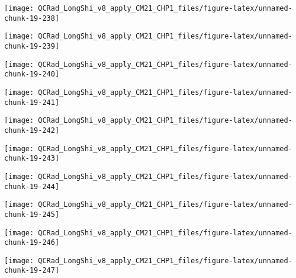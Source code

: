 \documentclass[
  10pt,
  a4paper,oneside]{article}
\begin{document}
\begin{center}\texttt{[image: QCRad\_LongShi\_v8\_apply\_CM21\_CHP1\_files/figure-latex/unnamed-chunk-19-238]} \end{center}

\begin{center}\texttt{[image: QCRad\_LongShi\_v8\_apply\_CM21\_CHP1\_files/figure-latex/unnamed-chunk-19-239]} \end{center}

\begin{center}\texttt{[image: QCRad\_LongShi\_v8\_apply\_CM21\_CHP1\_files/figure-latex/unnamed-chunk-19-240]} \end{center}

\begin{center}\texttt{[image: QCRad\_LongShi\_v8\_apply\_CM21\_CHP1\_files/figure-latex/unnamed-chunk-19-241]} \end{center}

\begin{center}\texttt{[image: QCRad\_LongShi\_v8\_apply\_CM21\_CHP1\_files/figure-latex/unnamed-chunk-19-242]} \end{center}

\begin{center}\texttt{[image: QCRad\_LongShi\_v8\_apply\_CM21\_CHP1\_files/figure-latex/unnamed-chunk-19-243]} \end{center}

\begin{center}\texttt{[image: QCRad\_LongShi\_v8\_apply\_CM21\_CHP1\_files/figure-latex/unnamed-chunk-19-244]} \end{center}

\begin{center}\texttt{[image: QCRad\_LongShi\_v8\_apply\_CM21\_CHP1\_files/figure-latex/unnamed-chunk-19-245]} \end{center}

\begin{center}\texttt{[image: QCRad\_LongShi\_v8\_apply\_CM21\_CHP1\_files/figure-latex/unnamed-chunk-19-246]} \end{center}

\begin{center}\texttt{[image: QCRad\_LongShi\_v8\_apply\_CM21\_CHP1\_files/figure-latex/unnamed-chunk-19-247]} \end{center}
\end{document}
